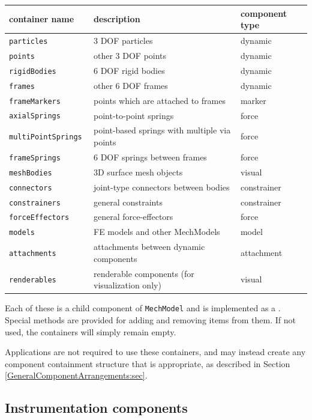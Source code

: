 \begin{shadedregion}
\begin{tabular}{lll}
\hline
container name & description & component type \\
\hline
\tt particles & 3 DOF particles & dynamic \\
\tt points & other 3 DOF points & dynamic \\
\tt rigidBodies & 6 DOF rigid bodies & dynamic \\
\tt frames & other 6 DOF frames & dynamic \\
\tt frameMarkers & points which are attached to frames & marker \\
\tt axialSprings & point-to-point springs & force \\
\tt multiPointSprings & point-based springs with multiple via points & force \\
\tt frameSprings & 6 DOF springs between frames & force \\
\tt meshBodies & 3D surface mesh objects & visual \\
\tt connectors & joint-type connectors between bodies & constrainer \\
\tt constrainers & general constraints & constrainer \\
\tt forceEffectors & general force-effectors & force \\
\tt models & FE models and other MechModels & model \\
\tt attachments & attachments between dynamic components & attachment \\
\tt renderables & renderable components (for visualization only) & visual \\
\hline
\end{tabular}
\end{shadedregion}
Each of these is a child component of {\tt MechModel} and is
implemented as a
. Special methods
are provided for adding and removing items from them. 
If not used, the containers will simply remain empty.

\begin{sideblock}
Applications are not required to use these containers, and may instead create
any component containment structure that is appropriate, as described in
Section \ref{GeneralComponentArrangements:sec}.
\end{sideblock}

\subsection{Instrumentation components}
\label{InstrumentationComponents:sec}

